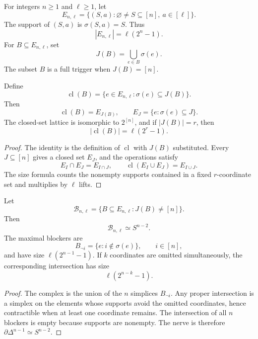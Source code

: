 \begin{definition}
\label{def:philosophy-coverage-trigger-system}
For integers $n\geq1$ and $\ell\geq1$, let
$$
  E_{n,\ell}
  =
  \{(S,a):\varnothing\neq S\subseteq[n],\ a\in[\ell]\}.
$$
The support of $(S,a)$ is $\sigma(S,a)=S$. Thus
$$
  |E_{n,\ell}|=\ell(2^{n}-1).
$$
For $B\subseteq E_{n,\ell}$, set
$$
  J(B)=\bigcup_{e\in B}\sigma(e).
$$
The subset $B$ is a full trigger when $J(B)=[n]$.
\end{definition}

\begin{theorem}
\label{thm:philosophy-universal-coverage-closure}
Define
$$
  \operatorname{cl}(B)
  =
  \{e\in E_{n,\ell}:\sigma(e)\subseteq J(B)\}.
$$
Then
$$
  \operatorname{cl}(B)=E_{J(B)},
  \qquad
  E_{J}=\{e:\sigma(e)\subseteq J\}.
$$
The closed-set lattice is isomorphic to $2^{[n]}$, and if
$|J(B)|=r$, then
$$
  |\operatorname{cl}(B)|=\ell(2^{r}-1).
$$
\end{theorem}
\begin{proof}
The identity is the definition of $\operatorname{cl}$ with
$J(B)$ substituted. Every $J\subseteq[n]$ gives a closed set $E_{J}$,
and the operations satisfy
$$
  E_{I}\cap E_{J}=E_{I\cap J},
  \qquad
  \operatorname{cl}(E_{I}\cup E_{J})=E_{I\cup J}.
$$
The size formula counts the nonempty supports contained in a fixed
$r$-coordinate set and multiplies by $\ell$ lifts.
\end{proof}

\begin{theorem}
\label{thm:philosophy-universal-blocker-topology}
Let
$$
  \mathcal{B}_{n,\ell}
  =
  \{B\subseteq E_{n,\ell}:J(B)\neq[n]\}.
$$
Then
$$
  \mathcal{B}_{n,\ell}\simeq S^{n-2}.
$$
The maximal blockers are
$$
  B_{\neg i}=\{e:i\notin\sigma(e)\},
  \qquad i\in[n],
$$
and have size $\ell(2^{n-1}-1)$. If $k$ coordinates are omitted
simultaneously, the corresponding intersection has size
$$
  \ell(2^{n-k}-1).
$$
\end{theorem}
\begin{proof}
The complex is the union of the $n$ simplices $B_{\neg i}$. Any
proper intersection is a simplex on the elements whose supports avoid
the omitted coordinates, hence contractible when at least one
coordinate remains. The intersection of all $n$ blockers is empty
because supports are nonempty. The nerve is therefore
$\partial\Delta^{n-1}\simeq S^{n-2}$.
\end{proof}

